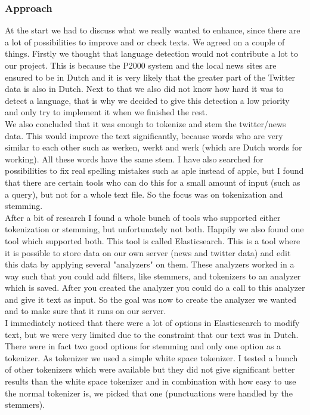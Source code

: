 \subsubsection*{Approach}
At the start we had to discuss what we really wanted to enhance, since there are a lot of possibilities to improve and or check texts. We agreed on a couple of things. Firstly we thought that language detection would not contribute a lot to our project. This is because the P2000 system and the local news sites are ensured to be in Dutch and it is very likely that the greater part of the Twitter data is also in Dutch. Next to that we also did not know how hard it was to detect a language, that is why we decided to give this detection a low priority and only try to implement it when we finished the rest. \\
We also concluded that it was enough to tokenize and stem the twitter/news data. This would improve the text significantly, because words who are very similar to each other such as werken, werkt and werk (which are Dutch words for working). All these words have the same stem. I have also searched for possibilities to fix real spelling mistakes such as aple instead of apple, but I found that there are certain tools who can do this for a small amount of input (such as a query), but not for a whole text file. So the focus was on tokenization and stemming.\\
After a bit of research I found a whole bunch of tools who supported either tokenization or stemming, but unfortunately not both. Happily we also found one tool which supported both. This tool is called Elasticsearch. This is a tool where it is possible to store data on our own server (news and twitter data) and edit this data by applying several "analyzers" on them. These analyzers worked in a way such that you could add filters, like stemmers, and tokenizers to an analyzer which is saved. After you created the analyzer you could do a call to this analyzer and give it text as input. So the goal was now to create the analyzer we wanted and to make sure that it runs on our server. \\
I immediately noticed that there were a lot of options in Elasticsearch to modify text, but we were very limited due to the constraint that our text was in Dutch. There were in fact two good options for stemming and only one option as a tokenizer. As tokenizer we used a simple white space tokenizer. I tested a bunch of other tokenizers which were available but they did not give significant better results than the white space tokenizer and in combination with how easy to use the normal tokenizer is, we picked that one (punctuations were handled by the stemmers). \\
